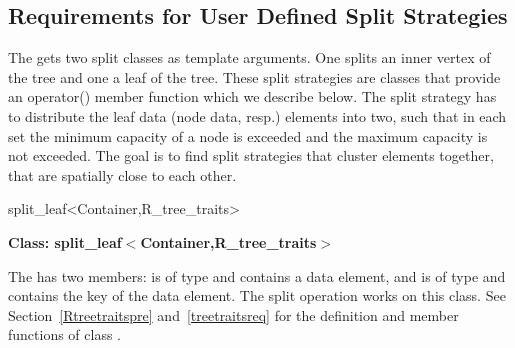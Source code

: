 \subsection{Requirements for User Defined Split Strategies}
\label{usersplit}
The  gets two split classes as template
arguments. One splits an inner vertex of the tree and
one a leaf of the tree. These split strategies are classes that
provide an operator() member function which we describe below.
The split strategy has to distribute the leaf data (node data,
resp.) elements into two, such that in each set the minimum capacity of a
node is exceeded and the maximum capacity is not exceeded.
The goal is to find split strategies that cluster elements
together, that
are spatially close to each other. 
\begin{ccClassTemplate}{split_leaf<Container,R_tree_traits>}

\noindent
{\bf Class: split\_leaf$<$Container,R\_tree\_traits$>$}

\ccDefinition

The  has two members:  is of
type  and contains a data element, and  is of
type  and contains the key of the data element.
The split operation works
on this class. See Section~\ref{Rtreetraitspre} and~\ref{treetraitsreq} for the definition and member
functions of class . 


\ccCreation
{}

\ccOperations
{}


\end{ccClassTemplate}


